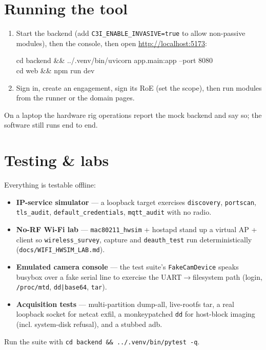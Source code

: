 \documentclass[11pt]{article}
\newif\ifintable\intablefalse
\newcommand{\code}[1]{\ifintable\texttt{#1}\else{\small\colorbox{codebg}{\texttt{#1}}}\fi}
\begin{document}
\section{Running the tool}
\begin{enumerate}
  \item Start the backend (add \code{C3I\_ENABLE\_INVASIVE=true} to allow
  non-passive modules), then the console, then open \url{http://localhost:5173}:
  \begin{codebox}\small\ttfamily
  cd backend \&\& ../.venv/bin/uvicorn app.main:app --port 8080\\
  cd web \&\& npm run dev
  \end{codebox}
  \item Sign in, create an engagement, sign its RoE (set the scope), then run
  modules from the runner or the domain pages.
\end{enumerate}
On a laptop the hardware rig operations report the mock backend and say so; the
software still runs end to end.

\section{Testing \& labs}
\label{sec:testing}
Everything is testable offline:
\begin{itemize}
  \item \textbf{IP-service simulator} --- a loopback target exercises
  \code{discovery}, \code{portscan}, \code{tls\_audit}, \code{default\_credentials},
  \code{mqtt\_audit} with no radio.
  \item \textbf{No-RF Wi-Fi lab} --- \code{mac80211\_hwsim} + hostapd stand up a
  virtual AP + client so \code{wireless\_survey}, capture and \code{deauth\_test}
  run deterministically (\texttt{docs/WIFI\_HWSIM\_LAB.md}).
  \item \textbf{Emulated camera console} --- the test suite's \texttt{FakeCamDevice}
  speaks busybox over a fake serial line to exercise the UART$\rightarrow$filesystem
  path (login, \texttt{/proc/mtd}, \texttt{dd|base64}, \texttt{tar}).
  \item \textbf{Acquisition tests} --- multi-partition dump-all, live-rootfs tar,
  a real loopback socket for netcat exfil, a monkeypatched \texttt{dd} for
  host-block imaging (incl. system-disk refusal), and a stubbed adb.
\end{itemize}
Run the suite with \code{cd backend \&\& ../.venv/bin/pytest -q}.
\end{document}

